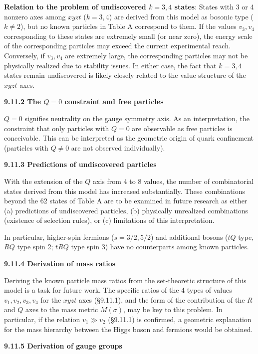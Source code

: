 \documentclass[
  a4paper,11pt]{article}
\theoremstyle{definition}
\theoremstyle{remark}
\begin{document}
\textbf{Relation to the problem of undiscovered \(k = 3, 4\) states}:
States with 3 or 4 nonzero axes among \(xyzt\) (\(k = 3, 4\)) are
derived from this model as bosonic type (\(k \neq 2\)), but no known
particles in Table A correspond to them. If the values \(v_3, v_4\)
corresponding to these states are extremely small (or near zero), the
energy scale of the corresponding particles may exceed the current
experimental reach. Conversely, if \(v_3, v_4\) are extremely large, the
corresponding particles may not be physically realized due to stability
issues. In either case, the fact that \(k = 3, 4\) states remain
undiscovered is likely closely related to the value structure of the
\(xyzt\) axes.

\textbf{9.11.2 The \(Q = 0\) constraint and free particles}

\(Q = 0\) signifies neutrality on the gauge symmetry axis. As an
interpretation, the constraint that only particles with \(Q = 0\) are
observable as free particles is conceivable. This can be interpreted as
the geometric origin of quark confinement (particles with \(Q \neq 0\)
are not observed individually).

\textbf{9.11.3 Predictions of undiscovered particles}

With the extension of the \(Q\) axis from 4 to 8 values, the number of
combinatorial states derived from this model has increased
substantially. These combinations beyond the 62 states of Table A are to
be examined in future research as either (a) predictions of undiscovered
particles, (b) physically unrealized combinations (existence of
selection rules), or (c) limitations of this interpretation.

In particular, higher-spin fermions (\(s = 3/2, 5/2\)) and additional
bosons (\(tQ\) type, \(RQ\) type spin 2; \(tRQ\) type spin 3) have no
counterparts among known particles.

\textbf{9.11.4 Derivation of mass ratios}

Deriving the known particle mass ratios from the set-theoretic structure
of this model is a task for future work. The specific ratios of the 4
types of values \(v_1, v_2, v_3, v_4\) for the \(xyzt\) axes (§9.11.1),
and the form of the contribution of the \(R\) and \(Q\) axes to the mass
metric \(M(\sigma)\), may be key to this problem. In particular, if the
relation \(v_1 \gg v_2\) (§9.11.1) is confirmed, a geometric explanation
for the mass hierarchy between the Higgs boson and fermions would be
obtained.

\textbf{9.11.5 Derivation of gauge groups}
\end{document}
